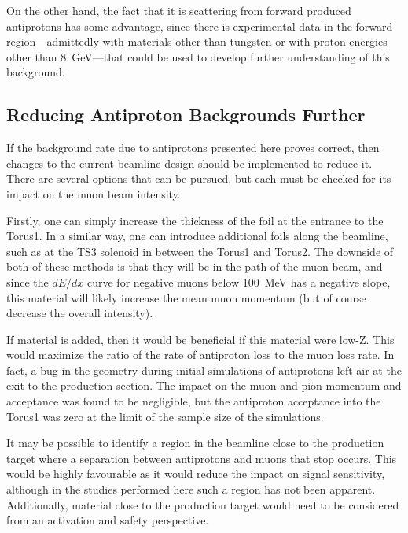 On the other hand, the fact that it is scattering from forward produced antiprotons has some advantage, since there is experimental data in the forward region---admittedly with materials other than tungsten or with proton energies other than 8~GeV---that could be used to develop further understanding of this background.

\subsection{Reducing Antiproton Backgrounds Further}
If the background rate due to antiprotons presented here proves correct, then changes to the current beamline design should be implemented to reduce it.
There are several options that can be pursued, but each must be checked for its impact on the muon beam intensity.

Firstly, one can simply increase the thickness of the foil at the entrance to the Torus1.
In a similar way, one can introduce additional foils along the beamline, such as at the TS3 solenoid in between the Torus1 and Torus2.
The downside of both of these methods is that they will be in the path of the muon beam, and since the $dE/dx$ curve for negative muons below 100~MeV has a negative slope, this material will likely increase the mean muon momentum (but of course decrease the overall intensity).

If material is added, then it would be beneficial if this material were low-Z.  This would maximize the ratio of the rate of antiproton loss to the muon loss rate.
In fact, a bug in the geometry during initial simulations of antiprotons left air at the exit to the production section.  
The impact on the muon and pion momentum and acceptance was found to be negligible, but the antiproton acceptance into the Torus1 was zero at the limit of the sample size of the simulations.

It may be possible to identify a region in the beamline close to the production target where a separation between antiprotons and muons that stop occurs.
This would be highly favourable as it would reduce the impact on signal sensitivity, although in the studies performed here such a region has not been apparent.
Additionally, material close to the production target would need to be considered from an activation and safety perspective.

